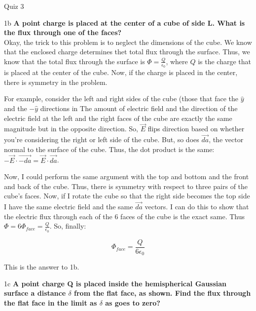 \begin{homeworkProblem}{Quiz 3}
    \begin{homeworkSection}{1b}
        \textbf{A point charge is placed at the center of a cube of side
        L. What is the flux through one of the faces?}
        \\

        Okay, the trick to this problem is to neglect the dimensions of
        the cube. We know that the enclosed charge determines thet total
        flux through the surface. Thus, we know that the total flux
        through the surface is $\Phi = \frac{Q}{\epsilon_0}$, where $Q$
        is the charge that is placed at the center of the cube. Now, if
        the charge is placed in the center, there is symmetry in the
        problem.
        
        For example, consider the left and right sides of the
        cube (those that face the $\hat{y}$ and the $-\hat{y}$
        directions in %
        The amount of electric field and the direction of the
        electric field at the left and the right faces of the cube are
        exactly the same magnitude but in the opposite direction. So,
        $\vec{E}$ flips direction based on whether you're considering
        the right or left side of the cube. But, so does $\vec{da}$, the
        vector normal to the surface of the cube. Thus, the dot product
        is the same: $-\vec{E}\cdot\vec{-da} =\vec{E}\cdot\vec{da}$.

        Now, I could perform the same argument with the top and bottom
        and the front and back of the cube. Thus, there is symmetry with
        respect to three pairs of the cube's faces. Now, if I rotate the
        cube so that the right side becomes the top side I have the same
        electric field and the same $\vec{da}$ vectors. I can do this to
        show that the electric flux through each of the 6 faces of the
        cube is the exact same. Thus $\Phi = 6\Phi_{face} =
        \frac{Q}{\epsilon_0}$. So, finally:

        \[
        \Phi_{face} = \frac{Q}{6\epsilon_0}
        \]

        This is the answer to 1b.
    \end{homeworkSection}

    \begin{homeworkSection}{1c}
        \textbf{A point charge Q is placed inside the hemispherical
        Gaussian surface a distance $\delta$ from the flat face, as
        shown. Find the flux through the flat face in the limit as
        $\delta$ as goes to zero?}
        \\


\end{homeworkSection}
\end{homeworkProblem}
